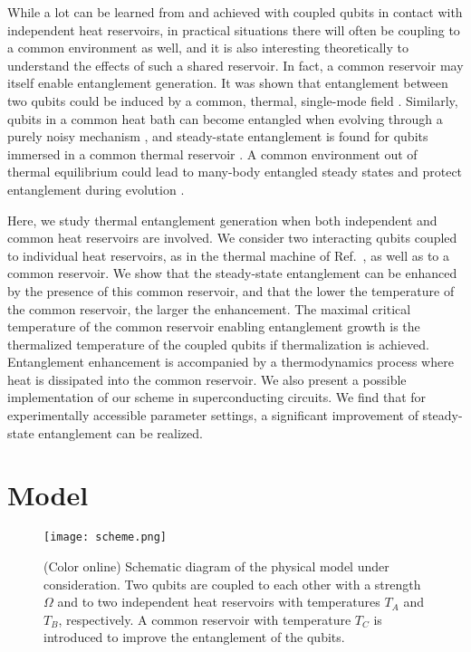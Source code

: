 \documentclass[12pt]{iopart}
\begin{document}
While a lot can be learned from and achieved with coupled qubits in contact with independent heat reservoirs, in practical situations there will often be coupling to a common environment as well, and it is also interesting theoretically to understand the effects of such a shared reservoir. In fact, a common reservoir may itself enable entanglement generation. It was shown that entanglement between two qubits could be induced by a common, thermal, single-mode field \cite{MSKim}. Similarly, qubits in a common heat bath can become entangled when evolving through a purely noisy mechanism \cite{nonint1,nonint2}, and steady-state entanglement is found for qubits immersed in a common thermal reservoir \cite{equi7}. A common environment out of thermal equilibrium could lead to many-body entangled steady states \cite{BB1,BB2} and protect entanglement during evolution \cite{BB3}.

Here, we study thermal entanglement generation when both independent and common heat reservoirs are involved. We consider two interacting qubits coupled to individual heat reservoirs, as in the thermal machine of Ref.~\cite{Brask2015}, as well as to a common reservoir. We show that the steady-state entanglement can be enhanced by the presence of this common reservoir, and that the lower the temperature of the common reservoir, the larger the enhancement. The maximal critical temperature of the common reservoir enabling entanglement growth is the thermalized temperature of the coupled qubits if thermalization is achieved. Entanglement enhancement is accompanied by a thermodynamics process where heat is dissipated into the common reservoir. We also present a possible implementation of our scheme in superconducting circuits. We find that for experimentally accessible parameter settings, a significant improvement of steady-state entanglement can be realized.


\section{Model }

\begin{figure}[tbp]
\begin{center}
{\texttt{[image: scheme.png]} }
\end{center}
\caption{(Color online) Schematic diagram of the physical model under
consideration. Two qubits are coupled to each other with
a strength $\Omega$ and to two independent heat reservoirs with temperatures $T_{A}$
and $T_{B}$, respectively. A common reservoir with temperature $T_{C}$ is introduced to improve the
entanglement of the qubits.
}
\label{model}
\end{figure}
\end{document}

